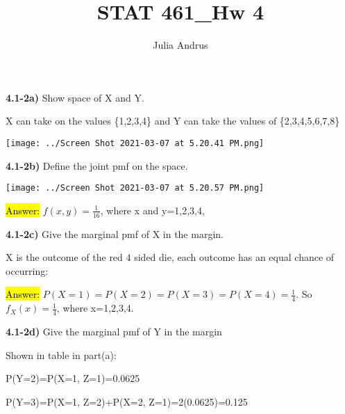 \documentclass{article}
\title{STAT 461\_Hw 4}
\author{Julia Andrus}
\date{}
\begin{document}
\maketitle 



\textbf{4.1-2a)} Show space of X and Y.

\vspace{2mm}

X can take on the values \{1,2,3,4\} and Y can take the values of \{2,3,4,5,6,7,8\}

\vspace{2mm}

\texttt{[image: ../Screen Shot 2021-03-07 at 5.20.41 PM.png]}





\newpage
\textbf{4.1-2b)} Define the joint pmf on the space.

\vspace{2mm}


\texttt{[image: ../Screen Shot 2021-03-07 at 5.20.57 PM.png]}



\hl{Answer:} $f(x,y)=\frac{1}{16}$, where x and y=1,2,3,4,

\textbf{4.1-2c)} Give the marginal pmf of X in the margin.

\vspace{2mm}

X is the outcome of the red 4 sided die, each outcome has an equal chance of occurring:

\vspace{2mm}


\hl{Answer:} $P(X=1)=P(X=2)=P(X=3)=P(X=4)=\frac{1}{4}$. So $f_{X}(x)=\frac{1}{4}$, where x=1,2,3,4.





\textbf{4.1-2d)} Give the marginal pmf of Y in the margin

\vspace{2mm}

Shown in table in part(a):

\vspace{2mm}

P(Y=2)=P(X=1, Z=1)=0.0625

P(Y=3)=P(X=1, Z=2)+P(X=2, Z=1)=2(0.0625)=0.125
\end{document}

